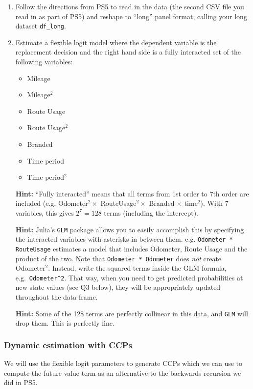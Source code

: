 \documentclass[12pt,english]{article}
\begin{document}
\begin{enumerate}
\item Follow the directions from PS5 to read in the data (the second CSV file you read in as part of PS5) and reshape to ``long'' panel format, calling your long dataset \texttt{df\_long}.

\item Estimate a flexible logit model where the dependent variable is the replacement decision and the right hand side is a fully interacted set of the following variables:
\begin{itemize}
    \item Mileage
    \item Mileage$^2$
    \item Route Usage
    \item Route Usage$^2$
    \item Branded
    \item Time period
    \item Time period$^2$
\end{itemize}

\textbf{Hint:} ``Fully interacted'' means that all terms from 1st order to 7th order are included (e.g. Odometer$^2 \times$ RouteUsage$^2 \times$ Branded $\times$ time$^2$). With 7 variables, this gives $2^7 = 128$ terms (including the intercept).

\textbf{Hint:} Julia's \texttt{GLM} package allows you to easily accomplish this by specifying the interacted variables with asterisks in between them. e.g. \texttt{Odometer * RouteUsage} estimates a model that includes Odometer, Route Usage and the product of the two. Note that \texttt{Odometer * Odometer} does \emph{not} create Odometer$^2$. Instead, write the squared terms inside the GLM formula, e.g.\ \texttt{Odometer\^{}2}. That way, when you need to get predicted probabilities at new state values (see Q3 below), they will be appropriately updated throughout the data frame.

\textbf{Hint:} Some of the 128 terms are perfectly collinear in this data, and \texttt{GLM} will drop them. This is perfectly fine.
\end{enumerate}

\subsubsection*{Dynamic estimation with CCPs}
We will use the flexible logit parameters to generate CCPs which we can use to compute the future value term as an alternative to the backwards recursion we did in PS5.
\end{document}
